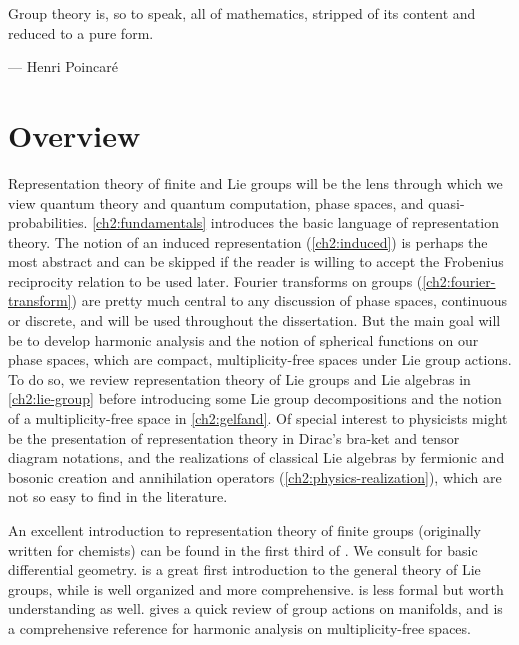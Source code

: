 \newcommand\rep{\rho}

\setlength\epigraphwidth{8.5cm}
\epigraph{Group theory is, so to speak, all of mathematics, stripped of its content and reduced to a pure form.}{--- \textup{Henri Poincar{\'e}}}


\section{Overview}

Representation theory of finite and Lie groups will be the lens through which we view quantum theory and quantum computation, phase spaces, and quasi-probabilities. \autoref{ch2:fundamentals} introduces the basic language of representation theory. The notion of an induced representation (\autoref{ch2:induced}) is perhaps the most abstract and can be skipped if the reader is willing to accept the Frobenius reciprocity relation to be used later.  Fourier transforms on groups (\autoref{ch2:fourier-transform}) are pretty much central to any discussion of phase spaces, continuous or discrete, and will be used throughout the dissertation. But the main goal will be to develop harmonic analysis and the notion of spherical functions on our phase spaces, which are compact, multiplicity-free spaces under Lie group actions. To do so, we review representation theory of Lie groups and Lie algebras in \autoref{ch2:lie-group} before introducing some Lie group decompositions and the notion of a multiplicity-free space in \autoref{ch2:gelfand}. Of special interest to physicists might be the presentation of representation theory in Dirac's bra-ket and tensor diagram notations, and the realizations of classical Lie algebras by fermionic and bosonic creation and annihilation operators (\autoref{ch2:physics-realization}), which are not so easy to find in the literature.

An excellent introduction to representation theory of finite groups (originally written for chemists) can be found in the first third of \cite{Serre}. We consult \cite{Lee} for basic differential geometry. \cite{Kirillov} is a great first introduction to the general theory of Lie groups, while \cite{Knapp} is well organized and more comprehensive. \cite{FH} is less formal but worth understanding as well. \cite{Berndt} gives a quick review of group actions on manifolds, and \cite{wolf2007harmonic} is a comprehensive reference for harmonic analysis on multiplicity-free spaces.

